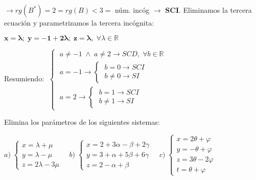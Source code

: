 \begin{proofw}
\noindent  $\to rg(B^*)=2=rg(B)<3=$ núm. incóg $\to$ \textbf{SCI}. Eliminamos la tercera ecuación y parametrizamos la tercera incógnita:

$\boldsymbol{x=\lambda; \; y=-1+2\lambda; \; z=\lambda},\; \forall \lambda \in \mathbb R$

\vspace{3mm}

Resumiendo: $\; \begin{cases}
\; a\neq -1 \; \wedge \; a\neq 2	 \to SCD, \; \forall b\in \mathbb R \\
\; a=-1 \to  \begin{cases} \;  b=0 \to SCI \\ \;  b\neq 0 \to SI \end{cases} \\
\; a=2 \to  \begin{cases} \;  b=1 \to SCI \\ \;  b\neq 1 \to SI \end{cases}
\end{cases}$
	
\end{proofw}


\begin{ejre}
Elimina los parámetros de los siguientes sistemas:

\noindent $a)\; \begin{cases} x=\lambda+\mu \\y=\lambda-\mu \\ z=2\lambda-3\mu\end{cases}  \quad 
b)\; \begin{cases} x=2+3\alpha-\beta+2\gamma \\ y=3+\alpha+5\beta+6\gamma\\ z=2-\alpha+\beta\end{cases}  \quad 
c)\; \begin{cases} x= 2\theta + \varphi\\y= -\theta+\varphi\\z=3\theta-2\varphi \\t=\theta+\varphi  \end{cases} $	
\end{ejre}

